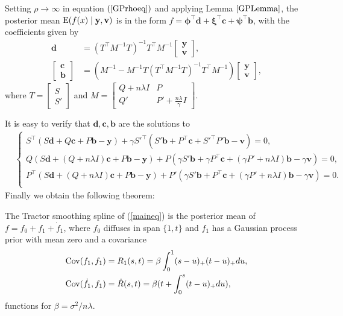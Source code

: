 Setting $\rho \rightarrow \infty$ in equation $(\ref{GPrhoeq})$ and applying Lemma $\ref{GPLemma}$, the posterior mean $\mathrm{E} (f(x)\mid \mathbf{y},\mathbf{v})$ is in the form $f  = \mathbf{\phi}^\top \mathbf{d}+\mathbf{\xi}^\top \mathbf{c}+\mathbf{\psi}^\top \mathbf{b}$, with the coefficients given by
\begin{align*} 
\mathbf{d}&=(T^\top M^{-1}T)^{-1}T^\top M^{-1}\begin{bmatrix}\mathbf{y} \\ \mathbf{v} \end{bmatrix},\\
\begin{bmatrix}\mathbf{c}\\\mathbf{b}\end{bmatrix} &=
(M^{-1}-M^{-1}T(T^\top M^{-1} T)^{-1}T^\top M^{-1})\begin{bmatrix}\mathbf{y}\\ \mathbf{v} \end{bmatrix},
\end{align*} where $T=\begin{bmatrix} S\\S' \end{bmatrix}$ and $M=\begin{bmatrix}
Q+n\lambda I& P\\
Q'& P'+\frac{n\lambda}{\gamma}I
\end{bmatrix}$.

It is easy to verify that $\mathbf{d},\mathbf{c},\mathbf{b}$ are the solutions to
\begin{align*}
&\begin{cases}
S^\top (S\mathbf{d} +Q\mathbf{c}+P\mathbf{b}-\mathbf{y}) +\gamma S'^\top( S'\mathbf{b}+ P^\top \mathbf{c}+S'^\top P'\mathbf{b}-\mathbf{v})=0, \\
Q(S\mathbf{d}+(Q+n\lambda I)\mathbf{c}+P\mathbf{b}-\mathbf{y}) + P ( \gamma S' \mathbf{b} +  \gamma P^\top \mathbf{c}+ (\gamma P'+n\lambda I) \mathbf{b}- \gamma \mathbf{v})=0, \\
P^\top (S\mathbf{d}+(Q+n\lambda I) \mathbf{c} +P\mathbf{b}-\mathbf{y})+P'(\gamma S'\mathbf{b}+P^\top \mathbf{c}+(\gamma P'+n\lambda I)\mathbf{b}- \gamma\mathbf{v})=0. \\
\end{cases}
\end{align*}
Finally we obtain the following theorem: 
\begin{theorem}
The Tractor smoothing spline of (\ref{maineq}) is the posterior
mean of $f=f_0+f_1 + \dot{f}_1$, where $f_0$ diffuses in span $\{ 1,t\}$ and $f_1$ has a Gaussian process prior with mean zero and a covariance 
\begin{align*}
\mathrm{Cov} (f_1,f_1)   &= R_1(s,t)   =\beta \int_{0}^{1} (s-u)_+(t-u)_+du, \\
\mathrm{Cov} (\dot{f}_1,f_1)  &= \dot{R}(s,t) =\beta (t+\int_0^s(t-u)_+du ),
\end{align*}
functions for $\beta = \sigma^2/n\lambda$.
\end{theorem}



